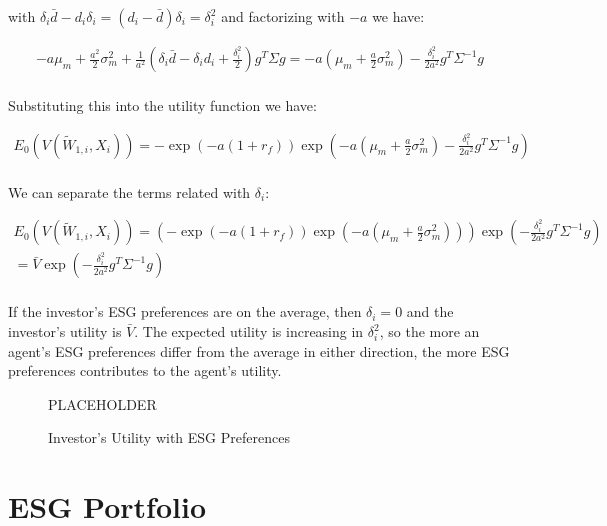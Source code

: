 with $\delta_i \bar{d} - d_i \delta_i = (d_i - \bar{d})\delta_i = \delta_i^2$ and 
factorizing with $-a$ we have:

\begin{equation}
    \begin{aligned}
        -a \mu_m + \frac{a^2}{2} \sigma^2_m + \frac{1}{a^2} ( \delta_i \bar{d} - \delta_i d_i + \frac{\delta_i^2}{2}) g^T \Sigma g = -a(\mu_m + \frac{a}{2}\sigma^2_m) - \frac{\delta_i^2}{2a^2}g^T \Sigma^{-1} g\\
    \end{aligned}
\end{equation}

Substituting this into the utility function we have:

\begin{equation}
    \begin{aligned}
        E_0(V(\tilde{W}_{1,i}, X_i)) = -\exp{(-a(1 + r_f))} \exp{(-a(\mu_m + \frac{a}{2}\sigma^2_m) - \frac{\delta_i^2}{2a^2}g^T \Sigma^{-1} g)} \\
    \end{aligned}
\end{equation}

We can separate the terms related with $\delta_i$: 

\begin{equation}
    \begin{aligned}
        E_0(V(\tilde{W}_{1,i}, X_i)) = (-\exp{(-a(1 + r_f))} \exp{(-a(\mu_m + \frac{a}{2}\sigma^2_m))}) \exp{(-\frac{\delta_i^2}{2a^2}g^T \Sigma^{-1} g)} \\
        = \bar{V} \exp{(-\frac{\delta_i^2}{2a^2}g^T \Sigma^{-1} g)} \\
    \end{aligned}
\end{equation}

If the investor's ESG preferences are on the average, then $\delta_i = 0$ and
the investor's utility is $\bar{V}$. The expected utility 
is increasing in $\delta_i^2$, so the more an agent's ESG preferences 
differ from the average in either direction, the more ESG preferences
contributes to the agent's utility.


\begin{figure}
    \centering
    PLACEHOLDER
    \caption{Investor's Utility with ESG Preferences}
    \label{fig:esg_utility}
\end{figure}

\newpage
\section{ESG Portfolio}

